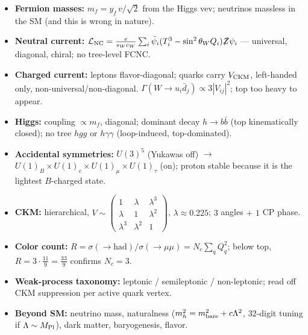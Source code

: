 \begin{itemize}
  \item \textbf{Fermion masses:} $m_f = y_f\,v/\sqrt2$ from the Higgs
        vev; neutrinos massless in the SM (and this is wrong in nature).
  \item \textbf{Neutral current:}
        $\mathcal{L}_{\rm NC}=\frac{e}{s_Wc_W}\sum_i\bar\psi_i
        (T^3_i-\sin^2\theta_W Q_i)\slashed Z\psi_i$ ---
        universal, diagonal, chiral; no tree-level FCNC.
  \item \textbf{Charged current:} leptons flavor-diagonal; quarks carry
        $V_{\rm CKM}$, left-handed only, non-universal/non-diagonal.
        $\Gamma(W\to u_i\bar d_j)\propto 3|V_{ij}|^2$; top too heavy to
        appear.
  \item \textbf{Higgs:} coupling $\propto m_f$, diagonal; dominant decay
        $h\to b\bar b$ (top kinematically closed); no tree $hgg$ or
        $h\gamma\gamma$ (loop-induced, top-dominated).
  \item \textbf{Accidental symmetries:} $U(3)^5$ (Yukawas off) $\to$
        $U(1)_B\times U(1)_e\times U(1)_\mu\times U(1)_\tau$ (on);
        proton stable because it is the lightest $B$-charged state.
  \item \textbf{CKM:} hierarchical,
        $V\sim\left(\begin{smallmatrix}1&\lambda&\lambda^3\\
        \lambda&1&\lambda^2\\\lambda^3&\lambda^2&1\end{smallmatrix}\right)$,
        $\lambda\approx0.225$; $3$ angles $+$ $1$ CP phase.
  \item \textbf{Color count:}
        $R=\sigma(\to\text{had})/\sigma(\to\mu\mu)=N_c\sum_q Q_q^2$;
        below top, $R=3\cdot\frac{11}{9}=\frac{33}{9}$ confirms $N_c=3$.
  \item \textbf{Weak-process taxonomy:} leptonic / semileptonic /
        non-leptonic; read off CKM suppression per active quark vertex.
  \item \textbf{Beyond SM:} neutrino mass, naturalness
        ($m_h^2=m_{\rm bare}^2+c\Lambda^2$, $32$-digit tuning if
        $\Lambda\sim M_{\rm Pl}$), dark matter, baryogenesis, flavor.
\end{itemize}

